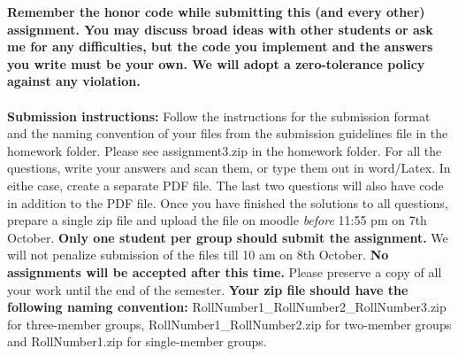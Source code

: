 \documentclass[11pt]{article}
\begin{document}
\maketitle

\textbf{Remember the honor code while submitting this (and every other) assignment. You may discuss broad ideas with other students or ask me for any difficulties, but the code you implement and the answers you write must be your own. We will adopt a \textbf{zero-tolerance policy} against any violation.}
\\
\\
\textbf{Submission instructions:} Follow the instructions for the submission format and the naming convention of your files from the submission guidelines file in the homework folder. Please see \textsf{assignment3.zip} in the homework folder. For all the questions, write your answers and scan them, or type them out in word/Latex. In eithe case, create a separate PDF file. The last two questions will also have code in addition to the PDF file. Once you have finished the solutions to all questions, prepare a single zip file and upload the file on moodle \emph{before} 11:55 pm on 7th October.  \textbf{Only one student per group should submit the assignment.} We will not penalize submission of the files till 10 am on 8th October. \textbf{No assignments will be accepted after this time.} Please preserve a copy of all your work until the end of the semester.  \textbf{Your zip file should have the following naming convention:} RollNumber1\_RollNumber2\_RollNumber3.zip for three-member groups, RollNumber1\_RollNumber2.zip for two-member groups and RollNumber1.zip for single-member groups. 
\end{document}
